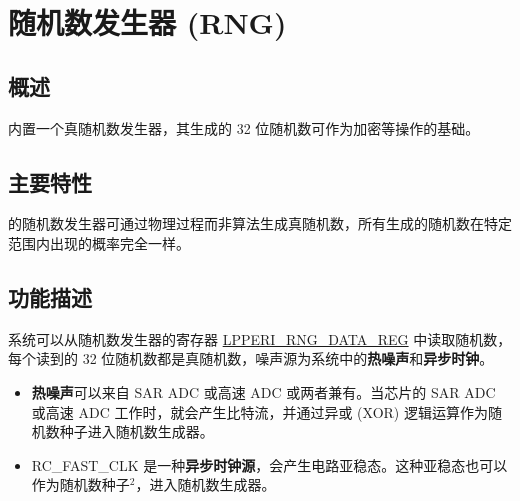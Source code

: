 \documentclass[main\_\_CN.tex]{subfiles}
\begin{document}

\ifglobal
\else
    {\let\clearpage\relax \listoftodos}
    {\let\clearpage\relax \listofdonetodos}
    \tableofcontents
\fi



\hypertarget{rng}{}
\chapter{随机数发生器 (RNG)}\label{mod:rng}

\section{概述}

\chipname{} 内置一个真随机数发生器，其生成的 32 位随机数可作为加密等操作的基础。

\section{主要特性}

\chipname{} 的随机数发生器可通过物理过程而非算法生成真随机数，所有生成的随机数在特定范围内出现的概率完全一样。

\section{功能描述}\label{sec:rng-func-descr}

系统可以从随机数发生器的寄存器 \hyperref[regdesc:LPPERIRNGDATAREG]{LPPERI\_RNG\_DATA\_REG} 中读取随机数，每个读到的 32 位随机数都是真随机数，噪声源为系统中的\textbf{热噪声}和\textbf{异步时钟}。

\begin{itemize}
    \item \textbf{热噪声}可以来自 SAR ADC 或高速 ADC 或两者兼有。当芯片的 SAR ADC 或高速 ADC 工作时，就会产生比特流，并通过异或 (XOR) 逻辑运算作为随机数种子进入随机数生成器。
    \item RC\_FAST\_CLK 是一种\textbf{异步时钟源}，会产生电路亚稳态。这种亚稳态也可以作为随机数种子\hyperref[others:rng-note-clock-seed]{$^2$}，进入随机数生成器。
\end{itemize}
\end{document}
